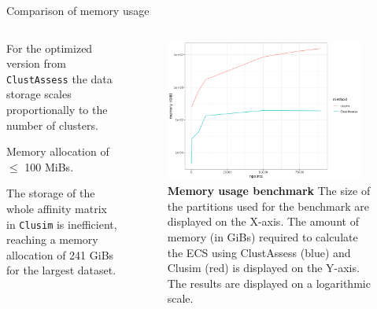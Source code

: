 \begin{frame}{Comparison of memory usage}
    \begin{columns}
        \begin{column}{0.45\textwidth}
            \justifying

            For the optimized version from \texttt{ClustAssess} the data storage scales proportionally to the number of clusters. 
            \bigskip
            
           Memory allocation of $\leq$ 100 MiBs. 
           \bigskip

           The storage of the whole affinity matrix in \texttt{Clusim} is inefficient, reaching a memory allocation of 241 GiBs for the largest dataset.
        \end{column}

        \begin{column}{0.5\textwidth}
            \begin{figure}
                \includegraphics[width=0.95\textwidth]{images/ch4/4_clusim_ca_memory.png}
                \caption{\justifying \textbf{Memory usage benchmark} The size of the partitions used for the benchmark are displayed on the X-axis. The amount of memory (in GiBs) required to calculate the ECS using ClustAssess (blue) and Clusim (red) is displayed on the Y-axis. The results are displayed on a logarithmic scale.}
            \end{figure}
        \end{column}
    \end{columns}
\end{frame}

